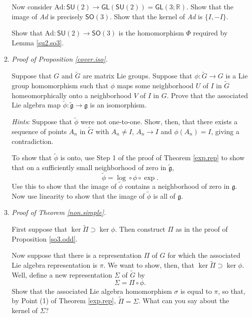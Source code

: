 \documentclass{amsbook}
\let \frak = \mathfrak
\theoremstyle{plain}
\numberwithin{equation}{chapter}
\numberwithin{theorem}{chapter}
\begin{document}
\begin{enumerate}
Now consider $\mathrm{Ad}:\mathsf{SU}(2)\rightarrow\mathsf{GL}\left(
\mathsf{SU}(2)\right)  =\mathsf{GL}\left(  3;\mathbb{R}\right)  $. Show that
the image of \textit{Ad} is precisely $\mathsf{SO}(3)$. Show that the kernel
of \textit{Ad} is $\{I,-I\}$.

Show that $\mathrm{Ad}:\mathsf{SU}(2)\rightarrow\mathsf{SO}(3)$ is the
homomorphism $\Phi$ required by Lemma \ref{su2.so3}.

\item \label{prove.cover.iso}\textit{Proof of Proposition \ref{cover.iso}.}

Suppose that $G$ and $\widetilde{G}$ are matrix Lie groups. Suppose that
$\phi:\widetilde{G}\rightarrow G$ is a Lie group homomorphism such that $\phi$
maps some neighborhood $U$ of $I$ in $\widetilde{G}$ homeomorphically onto a
neighborhood $V$ of $I$ in $G$. Prove that the associated Lie algebra map
$\widetilde{\phi}:\widetilde{\frak{g}}\rightarrow\frak{g}$ is an isomorphism.

\textit{Hints}: Suppose that $\widetilde{\phi}$ were not one-to-one. Show,
then, that there exists a sequence of points $A_{n}$ in $\widetilde{G}$ with
$A_{n}\neq I$, $A_{n}\rightarrow I$ and $\phi(A_{n})=I$, giving a contradiction.

To show that $\widetilde{\phi}$ is onto, use Step 1 of the proof of Theorem
\ref{exp.rep} to show that on a sufficiently small neighborhood of zero in
$\widetilde{\frak{g}}$,
\[
\widetilde{\phi}=\log\circ\phi\circ\exp\text{.}%
\]
Use this to show that the image of $\widetilde{\phi}$ contains a neighborhood
of zero in $\frak{g}$. Now use linearity to show that the image of
$\widetilde{\phi}$ is all of $\frak{g}$.

\item \label{prove.non.simple}\textit{Proof of Theorem \ref{non.simple}.}

First suppose that $\ker\widetilde{\Pi}\supset\ker\phi$. Then construct $\Pi$
as in the proof of Proposition \ref{so3.odd}.

Now suppose that there is a representation $\Pi$ of $G$ for which the
associated Lie algebra representation is $\pi$. We want to show, then, that
$\ker\widetilde{\Pi}\supset\ker\phi$. Well, define a new representation
$\Sigma$ of $\widetilde{G}$ by
\[
\Sigma=\Pi\circ\phi\text{.}%
\]
Show that the associated Lie algebra homomorphism $\sigma$ is equal to $\pi$,
so that, by Point (1) of Theorem \ref{exp.rep}, $\widetilde{\Pi}=\Sigma$. What
can you say about the kernel of $\Sigma$?


\end{enumerate}
\end{document}
